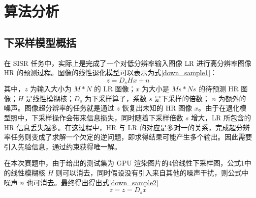 \documentclass[12pt, a4paper, oneside]{ctexbook}
\begin{document}
	
	\chapter{算法分析}
	\section{下采样模型概括}
	在 SISR 任务中，实际上是完成了一个对低分辨率输入图像 LR 进行高分辨率图像 HR 的预测过程。图像的线性退化模型可以表示为式\ref{down_sample1}：
	\begin{equation}
		z=D_sHx + n \label{down_sample1}
	\end{equation}
	其中，$z$ 为输入大小为 $M*N$ 的 LR 图像；$x$ 为大小是 $Ms*Ns$ 的待预测 HR 图像；$H$ 是线性模糊核；$D_s$ 为下采样算子，系数 $s$ 是下采样的倍数； $n$ 为额外的噪声。图像超分辨率的任务就是通过 $z$ 恢复出未知的 HR 图像 $x$。由于在退化模型照中，下采样操作会带来信息损失，同时随着下采样倍数 $s$ 增大，LR 所包含的 HR 信息丢失越多。在这过程中，HR 与 LR 的对应是多对一的关系，完成超分辨率任务则变成了求解一个欠定的逆问题，即求得结果可能产生多个输出。因此需要引入先验信息，通过约束获得唯一解。\par 在本次赛题中，由于给出的测试集为 GPU 渲染图片的4倍线性下采样图，公式1中的线性模糊核 $H$ 则可以消去，同时假设没有引入来自其他的噪声干扰，则公式中噪声 $n$ 也可消去。最终得出得出式\ref{down_sample2}
	\begin{equation}
		z=z=D_sx \label{down_sample2}
	\end{equation}
	
\end{document}
